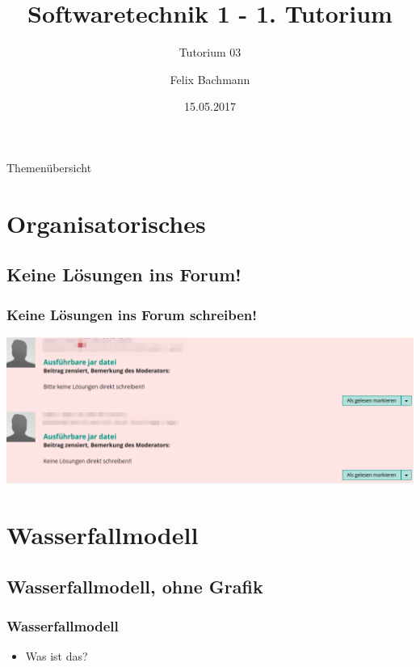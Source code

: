\documentclass[18pt]{beamer}
\title[SWT1]{Softwaretechnik 1 - 1. Tutorium}
\subtitle{Tutorium 03}
\author{Felix Bachmann}
\date{15.05.2017}
\institute{KIT - Institut für Programmstrukturen und Datenorganisation (IPD)}
\begin{document}

\begin{frame}
\titlepage
\end{frame}

\begin{frame}{Themenübersicht}
\tableofcontents
\end{frame}

\section{Organisatorisches}
	\subsection{Keine Lösungen ins Forum!}
	\begin{frame}
		\frametitle{Keine Lösungen ins Forum schreiben!}
		\includegraphics[height=0.85\textheight]{./pics/tut1/censored.png}
	\end{frame}

\section{Wasserfallmodell}
	\subsection{Wasserfallmodell, ohne Grafik}
	\begin{frame}
		\frametitle{Wasserfallmodell}
		\begin{itemize}
			\item Was ist das? 
		\end{itemize}
	\end{frame}
	
\end{document}
